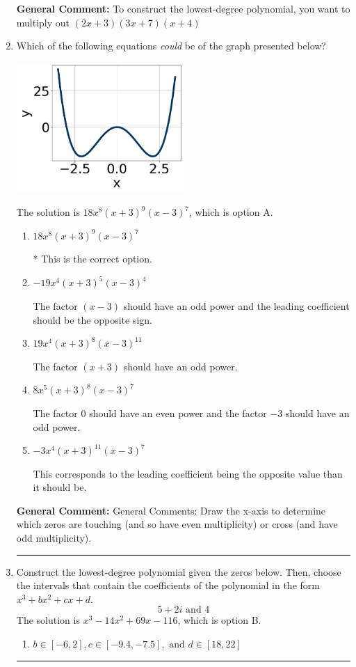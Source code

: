 \documentclass{extbook}[14pt]
\newcommand{\litem}[1]{\item #1

\rule{\textwidth}{0.4pt}}
\begin{document}
\begin{enumerate}
{\textbf{General Comment:} To construct the lowest-degree polynomial, you want to multiply out $(2x + 3)(3x + 7)(x + 4)$
}
\litem{
Which of the following equations \textit{could} be of the graph presented below?

\begin{center}
    \includegraphics[width=0.5\textwidth]{../Figures/polyGraphToFunctionCopyB.png}
\end{center}


The solution is \( 18x^{8} (x + 3)^{9} (x - 3)^{7} \), which is option A.\begin{enumerate}[label=\Alph*.]
\item \( 18x^{8} (x + 3)^{9} (x - 3)^{7} \)

* This is the correct option.
\item \( -19x^{4} (x + 3)^{5} (x - 3)^{4} \)

The factor $(x - 3)$ should have an odd power and the leading coefficient should be the opposite sign.
\item \( 19x^{4} (x + 3)^{8} (x - 3)^{11} \)

The factor $(x + 3)$ should have an odd power.
\item \( 8x^{5} (x + 3)^{8} (x - 3)^{7} \)

The factor $0$ should have an even power and the factor $-3$ should have an odd power.
\item \( -3x^{4} (x + 3)^{11} (x - 3)^{7} \)

This corresponds to the leading coefficient being the opposite value than it should be.
\end{enumerate}

\textbf{General Comment:} General Comments: Draw the x-axis to determine which zeros are touching (and so have even multiplicity) or cross (and have odd multiplicity).
}
\litem{
Construct the lowest-degree polynomial given the zeros below. Then, choose the intervals that contain the coefficients of the polynomial in the form $x^3+bx^2+cx+d$.
\[ 5 + 2 i \text{ and } 4 \]The solution is \( x^{3} -14 x^{2} +69 x -116 \), which is option B.\begin{enumerate}[label=\Alph*.]
\item \( b \in [-6, 2], c \in [-9.4, -7.5], \text{ and } d \in [18, 22] \)


\end{enumerate}}
\end{enumerate}
\end{document}
